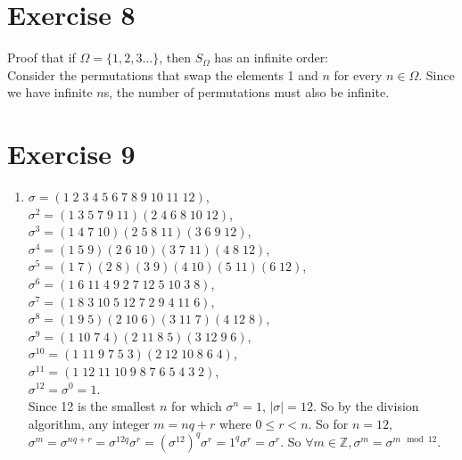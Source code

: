 \documentclass{article}
\newcommand{\Z}{\mathbb{Z}}
\begin{document}
    \section*{Exercise 8}
    Proof that if $\Omega = \{1, 2, 3 ...\}$,
    then $S_{\Omega}$ has an infinite order: \\
    Consider the permutations that swap the elements 1 and $n$
    for every $n \in \Omega$.
    Since we have infinite $n$s, the number of permutations must also be
    infinite.
      

    \section*{Exercise 9}
    \begin{enumerate}[label=\textbf{\alph*.}]
        \item 
            $\sigma = (1\;2\;3\;4\;5\;6\;7\;8\;9\;10\;11\;12)$, \\
            $\sigma^2 = (1\;3\;5\;7\;9\;11)(2\;4\;6\;8\;10\;12)$, \\
            $\sigma^3 = (1\;4\;7\;10)(2\;5\;8\;11)(3\;6\;9\;12)$, \\
            $\sigma^4 = (1\;5\;9)(2\;6\;10)(3\;7\;11)(4\;8\;12)$, \\
            $\sigma^5 = (1\;7)(2\;8)(3\;9)(4\;10)(5\;11)(6\;12)$, \\
            $\sigma^6 = (1\;6\;11\;4\;9\;2\;7\;12\;5\;10\;3\;8)$, \\
            $\sigma^7 = (1\;8\;3\;10\;5\;12\;7\;2\;9\;4\;11\;6)$, \\
            $\sigma^8 = (1\;9\;5)(2\;10\;6)(3\;11\;7)(4\;12\;8)$, \\
            $\sigma^9 = (1\;10\;7\;4)(2\;11\;8\;5)(3\;12\;9\;6)$, \\
            $\sigma^{10} = (1\;11\;9\;7\;5\;3)(2\;12\;10\;8\;6\;4)$, \\
            $\sigma^{11} = (1\;12\;11\;10\;9\;8\;7\;6\;5\;4\;3\;2)$, \\
            $\sigma^{12} = \sigma^0 = 1$. \\
            Since 12 is the smallest $n$ for which $\sigma^n = 1$, 
            $|\sigma| = 12$.
            So by the division algorithm, any integer $m = nq + r$
            where $0 \leqslant r < n$.
            So for $n = 12$, $\sigma^m = \sigma^{nq + r}
            = \sigma^{12q}\sigma^r
            = (\sigma^12)^q\sigma^r
            = 1^q\sigma^r 
            = \sigma^r$.
            So $\forall m \in \Z, \sigma^m = \sigma^{m \mod 12}$.

\end{enumerate}
\end{document}
